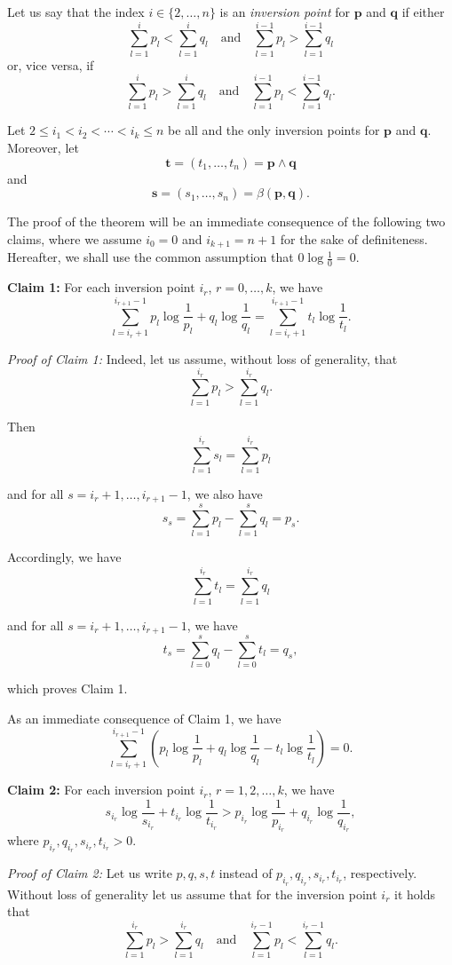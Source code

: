 Let us say that the index $i \in \{2, \ldots, n\}$ is an \emph{inversion point} for $\mathbf{p}$ and $\mathbf{q}$ if either
\[
\sum_{l=1}^{i} p_l < \sum_{l=1}^{i} q_l \quad \text{and} \quad \sum_{l=1}^{i-1} p_l > \sum_{l=1}^{i-1} q_l
\]
or, vice versa, if
\[
\sum_{l=1}^{i} p_l > \sum_{l=1}^{i} q_l \quad \text{and} \quad \sum_{l=1}^{i-1} p_l < \sum_{l=1}^{i-1} q_l.
\]

Let $2 \leq i_1 < i_2 < \cdots < i_k \leq n$ be all and the only inversion points for $\mathbf{p}$ and $\mathbf{q}$. Moreover, let
\[
\mathbf{t} = (t_1, \ldots, t_n) = \mathbf{p} \wedge \mathbf{q}
\]
and
\[
\mathbf{s} = (s_1, \ldots, s_n) = \beta(\mathbf{p}, \mathbf{q}).
\]

The proof of the theorem will be an immediate consequence of the following two claims, where we assume $i_0 = 0$ and $i_{k+1} = n + 1$ for the sake of definiteness. Hereafter, we shall use the common assumption that $0 \log \frac{1}{0} = 0$.

\textbf{Claim 1:} For each inversion point $i_r$, $r = 0, \ldots, k$, we have
\[
\sum_{l=i_r+1}^{i_{r+1}-1} p_l \log \frac{1}{p_l} + q_l \log \frac{1}{q_l} = \sum_{l=i_r+1}^{i_{r+1}-1} t_l \log \frac{1}{t_l}.
\]

\emph{Proof of Claim 1:} Indeed, let us assume, without loss of generality, that
\[
\sum_{l=1}^{i_r} p_l > \sum_{l=1}^{i_r} q_l.
\]

Then
\[
\sum_{l=1}^{i_r} s_l = \sum_{l=1}^{i_r} p_l
\]

and for all $s = i_r + 1, \ldots, i_{r+1} - 1$, we also have
\[
s_s = \sum_{l=1}^{s} p_l - \sum_{l=1}^{s} q_l = p_s.
\]

Accordingly, we have
\[
\sum_{l=1}^{i_r} t_l = \sum_{l=1}^{i_r} q_l
\]

and for all $s = i_r + 1, \ldots, i_{r+1} - 1$, we have
\[
t_s = \sum_{l=0}^{s} q_l - \sum_{l=0}^{s} t_l = q_s,
\]

which proves Claim 1.

As an immediate consequence of Claim 1, we have
\[
\sum_{l=i_r+1}^{i_{r+1}-1} \left( p_l \log \frac{1}{p_l} + q_l \log \frac{1}{q_l} - t_l \log \frac{1}{t_l} \right) = 0.
\]

\textbf{Claim 2:} For each inversion point $i_r$, $r = 1, 2, \ldots, k$, we have
\[
s_{i_r} \log \frac{1}{s_{i_r}} + t_{i_r} \log \frac{1}{t_{i_r}} > p_{i_r} \log \frac{1}{p_{i_r}} + q_{i_r} \log \frac{1}{q_{i_r}},
\]
where $p_{i_r}, q_{i_r}, s_{i_r}, t_{i_r} > 0$.

\emph{Proof of Claim 2:} Let us write $p, q, s, t$ instead of $p_{i_r}, q_{i_r}, s_{i_r}, t_{i_r}$, respectively. Without loss of generality let us assume that for the inversion point $i_r$ it holds that
\[
\sum_{l=1}^{i_r} p_l > \sum_{l=1}^{i_r} q_l \quad \text{and} \quad \sum_{l=1}^{i_r-1} p_l < \sum_{l=1}^{i_r-1} q_l.
\]

